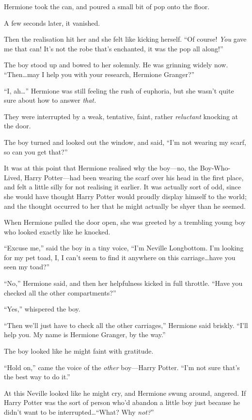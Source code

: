 Hermione took the can, and poured a small bit of pop onto the floor.

A few seconds later, it vanished.

Then the realisation hit her and she felt like kicking herself. “Of course! \emph{You} gave me that can! It’s not the robe that’s enchanted, it was the pop all along!”

The boy stood up and bowed to her solemnly. He was grinning widely now. “Then…may I help you with your research, Hermione Granger?”

“I, ah…” Hermione was still feeling the rush of euphoria, but she wasn’t quite sure about how to answer \emph{that.}

They were interrupted by a weak, tentative, faint, rather \emph{reluctant} knocking at the door.

The boy turned and looked out the window, and said, “I’m not wearing my scarf, so can you get that?”

It was at this point that Hermione realised why the boy—no, the Boy-Who-Lived, Harry Potter—had been wearing the scarf over his head in the first place, and felt a little silly for not realising it earlier. It was actually sort of odd, since she would have thought Harry Potter would proudly display himself to the world; and the thought occurred to her that he might actually be shyer than he seemed.

When Hermione pulled the door open, she was greeted by a trembling young boy who looked exactly like he knocked.

“Excuse me,” said the boy in a tiny voice, “I’m Neville Longbottom. I’m looking for my pet toad, I, I can’t seem to find it anywhere on this carriage…have you seen my toad?”

“No,” Hermione said, and then her helpfulness kicked in full throttle. “Have you checked all the other compartments?”

“Yes,” whispered the boy.

“Then we’ll just have to check all the other carriages,” Hermione said briskly. “I’ll help you. My name is Hermione Granger, by the way.”

The boy looked like he might faint with gratitude.

“Hold on,” came the voice of the \emph{other} boy—Harry Potter. “I’m not sure that’s the best way to do it.”

At this Neville looked like he might cry, and Hermione swung around, angered. If Harry Potter was the sort of person who’d abandon a little boy just because he didn’t want to be interrupted…“What? Why \emph{not?}”

